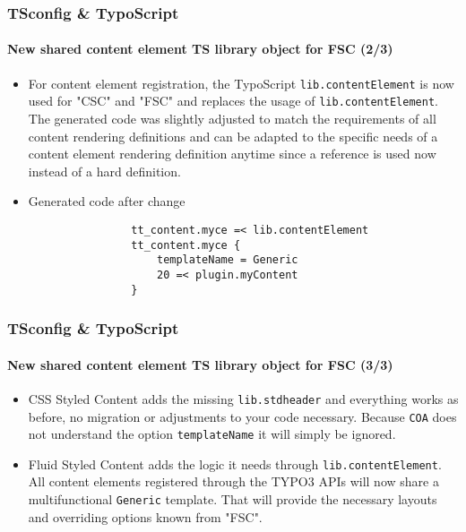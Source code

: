 
\begin{frame}[fragile]
	\frametitle{TSconfig \& TypoScript}
	\framesubtitle{New shared content element TS library object for FSC (2/3)}

	\begin{itemize}
		\item For content element registration, the TypoScript \texttt{lib.contentElement} is now
			used for "CSC" and "FSC" and replaces the usage of \texttt{lib.contentElement}. The
			generated code was slightly adjusted to match the requirements of all content rendering
			definitions and can be adapted to the specific needs of a content element rendering
			definition anytime since a reference is used now instead of a hard definition.

		\item Generated code after change

			\begin{lstlisting}
				tt_content.myce =< lib.contentElement
				tt_content.myce {
				    templateName = Generic
				    20 =< plugin.myContent
				}
			\end{lstlisting}
	\end{itemize}

\end{frame}


\begin{frame}[fragile]
	\frametitle{TSconfig \& TypoScript}
	\framesubtitle{New shared content element TS library object for FSC (3/3)}

	\begin{itemize}
		\item CSS Styled Content adds the missing \texttt{lib.stdheader} and everything works as
			before, no migration or adjustments to your code necessary. Because \texttt{COA} does
			not understand the option \texttt{templateName} it will simply be ignored.

		\item Fluid Styled Content adds the logic it needs through \texttt{lib.contentElement}.
			All content elements registered through the TYPO3 APIs will now share a multifunctional
			\texttt{Generic} template. That will provide the necessary layouts and overriding options
			known from "FSC".

	\end{itemize}
\end{frame}

